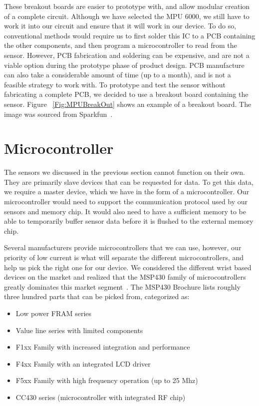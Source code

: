 These breakout boards are easier to prototype with, and allow modular creation of a complete circuit. Although we have selected the MPU 6000, we still have to work it into our circuit and ensure that it will work in our device. To do so, conventional methods would require us to first solder this IC to a PCB containing the other components, and then program a microcontroller to read from the sensor. However, PCB fabrication and soldering can be expensive, and are not a viable option during the prototype phase of product design. PCB manufacture can also take a considerable amount of time (up to a month), and is not a feasible strategy to work with. To prototype and test the sensor without fabricating a complete PCB, we decided to use a breakout board containing the sensor. Figure ~\ref{Fig:MPUBreakOut} shows an example of a breakout board. The image was sourced from Sparkfun~\cite{Web:SFBreakout}.

\section{Microcontroller}
\label{Sec:MicroController}

The sensors we discussed in the previous section cannot function on their own. They are primarily slave devices that can be requested for data. To get this data, we require a master device, which we have in the form of a microcontroller. Our microcontroller would need to support the communication protocol used by our sensors and memory chip. It would also need to have a sufficient memory to be able to temporarily buffer sensor data before it is flushed to the external memory chip. 

Several manufacturers provide microcontrollers that we can use, however,
our priority of low current is what will separate the different microcontrollers,
and help us pick the right one for our device.
We considered the different wrist based devices on the market and realized that the MSP430 family of microcontrollers greatly dominates this market segment~\cite{lo2005body,polastre2005telos,werner2006deploying}.
The MSP430 Brochure \cite{instruments2009msp430} lists roughly three hundred parts that can be picked from, categorized as:

\begin{itemize}
  \item Low power FRAM series
  \item Value line series with limited components
  \item F1xx Family with increased integration and performance
  \item F4xx Family with an integrated LCD driver
  \item F5xx Family with high frequency operation (up to 25 Mhz)
  \item CC430 series (microcontroller with integrated RF chip)
\end{itemize}

